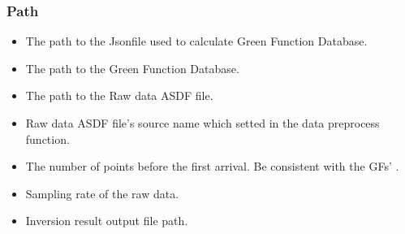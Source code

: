 \documentclass[a4paper,10pt,english,openany]{sphinxmanual}
\begin{document}
\subsubsection{Path}
\label{\detokenize{tutorials/S4_Inv_DC:path}}
\begin{itemize}
\item {} 
The path to the Json\sphinxhyphen{}file used to calculate Green Function Database.

\end{itemize}

\begin{itemize}
\item {} 
The path to the Green Function Database.

\end{itemize}

\begin{itemize}
\item {} 
The path to the Raw data ASDF file.

\end{itemize}

\begin{itemize}
\item {} 
Raw data ASDF file’s source name which setted in the data preprocess function.

\end{itemize}

\begin{itemize}
\item {} 
The number of points before the first arrival. Be consistent with the GFs’ .

\end{itemize}

\begin{itemize}
\item {} 
Sampling rate of the raw data.

\end{itemize}

\begin{itemize}
\item {} 
Inversion result output file path.

\end{itemize}
\end{document}
